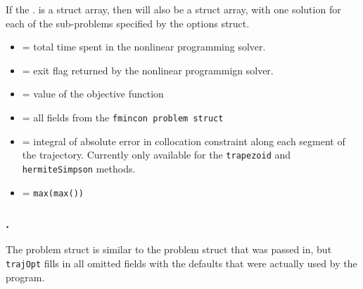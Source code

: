 \par If the . is a struct array, then  will also be a struct array, with one solution for each of the sub-problems specified by the options struct.

\begin{itemize} \setlength\itemsep{-0.1em}
\item {} = total time spent in the nonlinear programming solver.
\item {} = exit flag returned by the nonlinear programmign solver.
\item {} = value of the objective function
\item {} = all fields from the \texttt{fmincon problem struct} 
\item {} = integral of absolute error in collocation constraint along each segment of the trajectory. Currently only available for the \texttt{trapezoid} and \texttt{hermiteSimpson} methods. 
\item {} = \texttt{max(max())}
\end{itemize}

\subsubsection*{.}

The problem struct is similar to the problem struct that was passed in, but \texttt{trajOpt} fills in all omitted fields with the defaults that were actually used by the program.